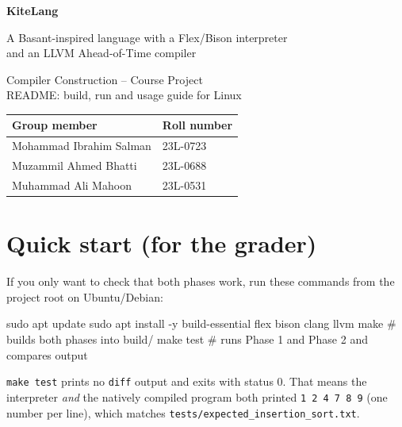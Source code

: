 \documentclass[11pt,a4paper]{article}
\newcommand{\fn}[1]{\texttt{#1}}
\begin{document}
\begin{titlepage}
\centering
\vspace*{2.5cm}
{\color{cProcess}\Huge\bfseries KiteLang\par}
\vspace{0.4cm}
{\Large A Basant-inspired language with a Flex/Bison interpreter\\ and an LLVM Ahead-of-Time compiler\par}
\vspace{0.8cm}
{\large\color{cNeutral} Compiler Construction -- Course Project\\ README: build, run and usage guide for Linux\par}
\vspace{1.8cm}
\begin{tabular}{ll}
\toprule
\textbf{Group member} & \textbf{Roll number}\\
\midrule
Mohammad Ibrahim Salman & 23L-0723\\
Muzammil Ahmed Bhatti & 23L-0688\\
Muhammad Ali Mahoon & 23L-0531\\
\bottomrule
\end{tabular}
\vfill
{}
\vspace{1cm}
\end{titlepage}

\tableofcontents
\newpage

\section{Quick start (for the grader)}

If you only want to check that both phases work, run these commands from the project root on Ubuntu/Debian:

\begin{shell}
sudo apt update
sudo apt install -y build-essential flex bison clang llvm
make            # builds both phases into build/
make test       # runs Phase 1 and Phase 2 and compares output
\end{shell}

\begin{resultbox}
\fn{make test} prints no \fn{diff} output and exits with status 0. That means the interpreter \emph{and} the natively compiled program both printed \fn{1 2 4 7 8 9} (one number per line), which matches \fn{tests/expected\_insertion\_sort.txt}.
\end{resultbox}
\end{document}
